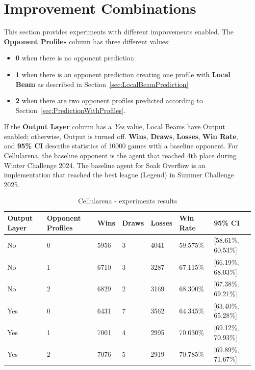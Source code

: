\documentclass[shortabstract, mgr, english]{iithesis}
\begin{document}
\section{Improvement Combinations}
This section provides experiments with different improvements enabled. The \textbf{Opponent Profiles} column has three different values:
\begin{itemize}[itemsep=1\itemsep,parsep=1\parsep,partopsep=1\partopsep,topsep=1\topsep]
    \item \textbf{0} when there is no opponent prediction
    \item \textbf{1} when there is an opponent prediction creating one profile with \textbf{Local Beam} as described in Section~\ref{sec:LocalBeamPrediction}
    \item \textbf{2} when there are two opponent profiles predicted according to Section~\ref{sec:PredictionWithProfiles}.
\end{itemize}
If the \textbf{Output Layer} column has a \emph{Yes} value, Local Beams have Output enabled; otherwise, Output is turned off. \textbf{Wins}, \textbf{Draws}, \textbf{Losses}, \textbf{Win Rate}, and \textbf{95\% CI} describe statistics of 10000 games with a baseline opponent. For Cellularena, the baseline opponent is the agent that reached 4th place during Winter Challenge 2024. The baseline agent for Soak Overflow is an implementation that reached the best league (Legend) in Summer Challenge 2025.

\begin{table}[H]
\centering
\begin{tabular}{C{0.11\textwidth}C{0.13\textwidth}C{0.08\textwidth}C{0.08\textwidth}C{0.08\textwidth}C{0.11\textwidth}C{0.22\textwidth}}
\toprule
\textbf{Output Layer} & \textbf{Opponent Profiles} & \textbf{Wins} & \textbf{Draws} & \textbf{Losses} & \textbf{Win Rate} & \textbf{95\% CI} \\
\midrule
No  & 0 & 5956 & 3 & 4041 & 59.575\% & [58.61\%, 60.53\%]  \\
No  & 1 & 6710 & 3 & 3287 & 67.115\% & [66.19\%, 68.03\%]  \\
No  & 2 & 6829 & 2 & 3169 & 68.300\% & [67.38\%, 69.21\%]  \\
Yes & 0 & 6431 & 7 & 3562 & 64.345\% & [63.40\%, 65.28\%]  \\
Yes & 1 & 7001 & 4 & 2995 & 70.030\% & [69.12\%, 70.93\%]  \\
Yes & 2 & 7076 & 5 & 2919 & 70.785\% & [69.89\%, 71.67\%]  \\
\bottomrule
\end{tabular}
\caption{Cellularena - experiments results}
\end{table}
\end{document}
